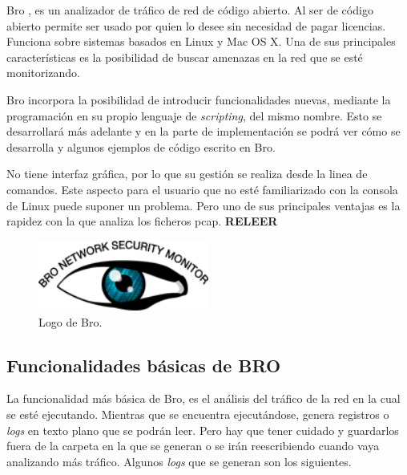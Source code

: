 Bro \cite{broindex}, es un analizador de tráfico de red de código abierto. Al ser de código abierto permite 
ser usado por quien lo desee sin necesidad de pagar licencias. Funciona sobre sistemas basados en Linux y 
Mac OS X. Una de sus principales características es la posibilidad de buscar amenazas en la red que 
se esté monitorizando.

\intro Bro incorpora la posibilidad de introducir funcionalidades nuevas, mediante la programación en su 
propio lenguaje de \textit{scripting}, del mismo nombre. Esto se desarrollará más adelante y en la 
parte de implementación se podrá ver cómo se desarrolla y algunos ejemplos de código escrito en Bro.

\intro No tiene interfaz gráfica, por lo que su gestión se realiza desde la linea de comandos. Este aspecto 
para el usuario que no esté familiarizado con la consola de Linux puede suponer un problema. {Pero uno de sus 
principales ventajas es la rapidez con la que analiza los ficheros pcap.} \textbf{RELEER}

\begin{figure}[H]
  \includegraphics[width=0.5\textwidth]{imagenes/logo-bro.png}
  \centering
  \caption{Logo de Bro.}
\end{figure}

\subsection{Funcionalidades básicas de BRO}

La funcionalidad más básica de Bro, es el análisis del tráfico de la red en la cual se esté ejecutando. 
Mientras que se encuentra ejecutándose, genera registros o \textit{logs} en texto plano que se 
podrán leer. Pero hay que tener cuidado y guardarlos fuera de la carpeta en la que se generan o se 
irán reescribiendo cuando vaya analizando más tráfico. Algunos \textit{logs} que se generan son los siguientes.

